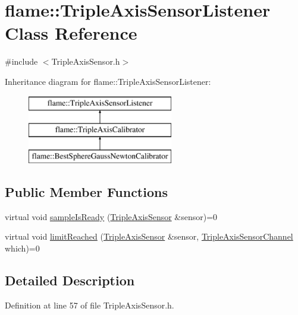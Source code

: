 \hypertarget{classflame_1_1_triple_axis_sensor_listener}{\section{flame\-:\-:Triple\-Axis\-Sensor\-Listener Class Reference}
\label{classflame_1_1_triple_axis_sensor_listener}
}


{\ttfamily \#include $<$Triple\-Axis\-Sensor.\-h$>$}

Inheritance diagram for flame\-:\-:Triple\-Axis\-Sensor\-Listener\-:\begin{figure}[H]
\begin{center}
\leavevmode
\includegraphics[height=3.000000cm]{classflame_1_1_triple_axis_sensor_listener}
\end{center}
\end{figure}
\subsection*{Public Member Functions}
\begin{DoxyCompactItemize}
\item 
virtual void \hyperlink{classflame_1_1_triple_axis_sensor_listener_a4451e2df32ad722464a1902ef29ed054}{sample\-Is\-Ready} (\hyperlink{classflame_1_1_triple_axis_sensor}{Triple\-Axis\-Sensor} \&sensor)=0
\item 
virtual void \hyperlink{classflame_1_1_triple_axis_sensor_listener_a56c75bbcf89043b53b938e3f9045db38}{limit\-Reached} (\hyperlink{classflame_1_1_triple_axis_sensor}{Triple\-Axis\-Sensor} \&sensor, \hyperlink{namespaceflame_a626e8c99d0f4f232b95e7089c113095a}{Triple\-Axis\-Sensor\-Channel} which)=0
\end{DoxyCompactItemize}


\subsection{Detailed Description}


Definition at line 57 of file Triple\-Axis\-Sensor.\-h.



